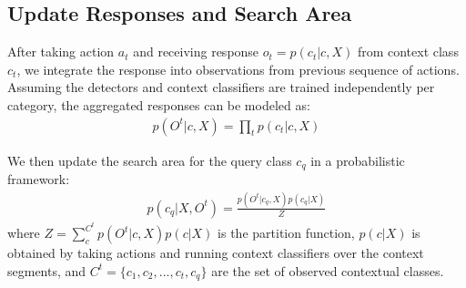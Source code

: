 \subsection{Update Responses and Search Area}
After taking action $a_t$ and receiving response $o_t = p(c_t|c, X)$ from context class $c_t$, we integrate the response into observations from previous sequence of actions. Assuming the detectors and context classifiers are trained independently per category, the aggregated responses can be modeled as:
\begin{eqnarray}
p(O^t|c, X) = \prod_t p(c_t|c,X)
\end{eqnarray}

We then update the search area for the query class $c_q$ in a probabilistic framework:
\begin{eqnarray}
p(c_q|X,O^t) = \frac{p(O^t|c_q,X)p(c_q|X)}{Z}
\end{eqnarray}
where $Z = \sum_c^{C^t} p(O^t|c,X)p(c|X)$ is the partition function, $p(c|X)$ is obtained by taking actions and running context classifiers over the context segments,  and $C^t = \{c_1, c_2, ..., c_t, c_q\}$ are the set of observed contextual classes.
